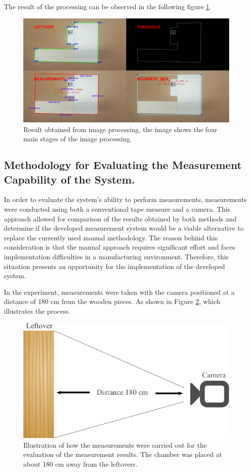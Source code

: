 The result of the processing can be observed in the following figure \ref{fig:imagemprocessing}.

\begin{figure}
    \centering
    \includegraphics[width=0.65\linewidth]{images/chap5/imageProcessing.png}
    \caption{Result obtained from image processing, the image shows the four main stages of the image processing.}
    \label{fig:imagemprocessing}
\end{figure}

\newpage
\subsection{Methodology for Evaluating the Measurement Capability of the System.}

In order to evaluate the system's ability to perform measurements, measurements were conducted using both a conventional tape measure and a camera. This approach allowed for comparison of the results obtained by both methods and determine if the developed measurement system would be a viable alternative to replace the currently used manual methodology. The reason behind this consideration is that the manual approach requires significant effort and faces implementation difficulties in a manufacturing environment. Therefore, this situation presents an opportunity for the implementation of the developed system.

In the experiment, measurements were taken with the camera positioned at a distance of 180 cm from the wooden pieces. As shown in Figure \ref{fig:methodology}, which illustrates the process.

\begin{figure}
    \centering
    \includegraphics[width=0.65\linewidth]{images/method.pdf}
    \caption{Illustration of how the measurements were carried out for the evaluation of the measurement results. The chamber was placed at about 180 cm away from the leftovers.}
    \label{fig:methodology}
\end{figure}

